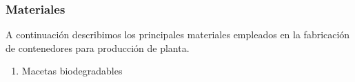 \documentclass[a4paper,12pt,oneside]{article}
\begin{document}
\subsubsection{Materiales}
\label{sec:org0129e9e}
A continuación describimos los principales materiales empleados en la
fabricación de contenedores para producción de planta.
\begin{enumerate}
\item Macetas biodegradables
\label{sec:org296b6ac}
\end{enumerate}
\end{document}
